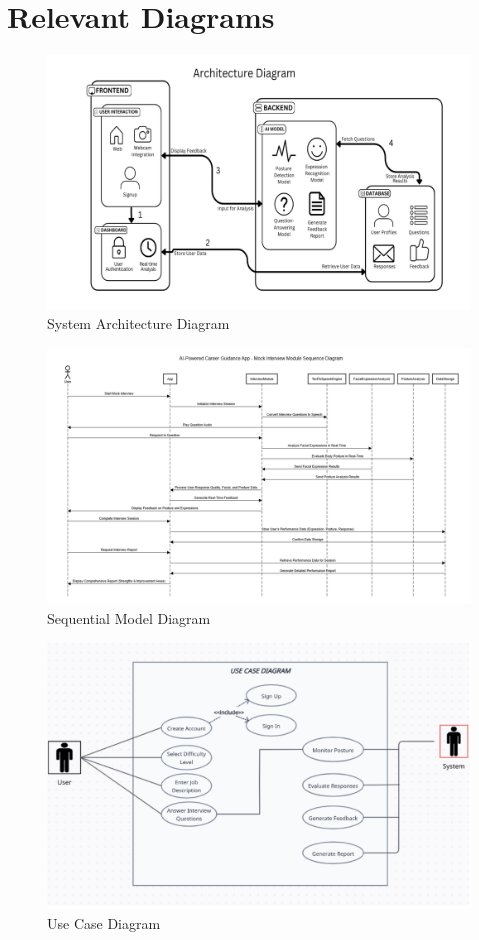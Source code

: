 \section{Relevant Diagrams}
\begin{figure}[h]
\centering
\includegraphics[width=0.8\linewidth]{sections/diagrams/ArchitectureDiagram.png}
\caption{System Architecture Diagram}
\label{fig:architecture}
\end{figure}

\begin{figure}[h]
\centering
\includegraphics[width=0.8\linewidth]{sections/diagrams/SequentialModel.png}
\caption{Sequential Model Diagram}
\label{fig:sequential}
\end{figure}

\begin{figure}[h]
\centering
\includegraphics[width=0.8\linewidth]{sections/diagrams/UseCase.png}
\caption{Use Case Diagram}
\label{fig:usecase}
\end{figure}
